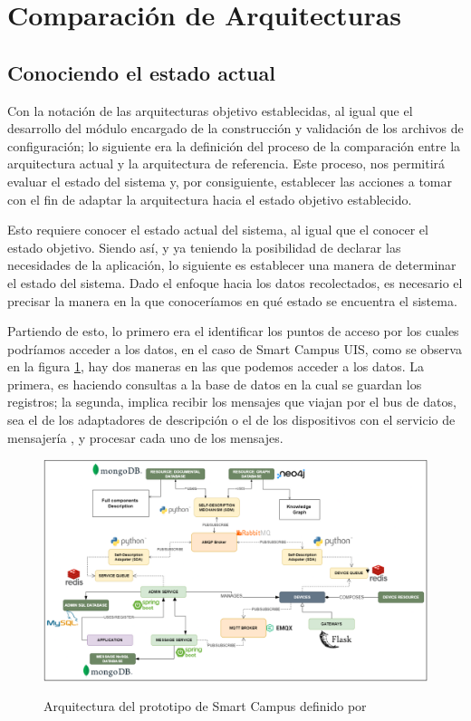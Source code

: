 \section{Comparación de Arquitecturas}

\subsection{Conociendo el estado actual}

Con la notación de las arquitecturas objetivo establecidas, al igual que el desarrollo del módulo encargado de la construcción y validación de los archivos de configuración; lo siguiente era la definición del proceso de la comparación entre la arquitectura actual y la arquitectura de referencia. Este proceso, nos permitirá evaluar el estado del sistema y, por consiguiente, establecer las acciones a tomar con el fin de adaptar la arquitectura hacia el estado objetivo establecido.

Esto requiere conocer el estado actual del sistema, al igual que el conocer el estado objetivo. Siendo así, y ya teniendo la posibilidad de declarar las necesidades de la aplicación, lo siguiente es establecer una manera de determinar el estado del sistema. Dado el enfoque hacia los datos recolectados, es necesario el precisar la manera en la que conoceríamos en qué estado se encuentra el sistema.

Partiendo de esto, lo primero era el identificar los puntos de acceso por los cuales podríamos acceder a los datos, en el caso de Smart Campus UIS, como se observa en la figura \ref{fig:ArquitecturaSmartCampus}, hay dos maneras en las que podemos acceder a los datos. La primera, es haciendo consultas a la base de datos en la cual se guardan los registros; la segunda, implica recibir los mensajes que viajan por el bus de datos, sea el de los adaptadores de descripción o el de los dispositivos con el servicio de mensajería , y procesar cada uno de los mensajes.

\begin{figure}[ht]
    \centering
    \caption{Arquitectura del prototipo de Smart Campus definido por }
    \includegraphics[width=\linewidth]{images/ArquitecturaSmartCampus.png}
    \label{fig:ArquitecturaSmartCampus}
\end{figure}


